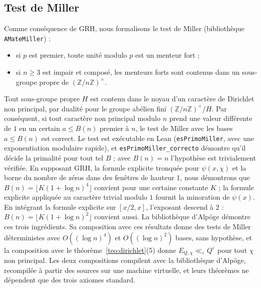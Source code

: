 \documentclass[11pt,a4paper]{amsart}
\theoremstyle{definition}
\theoremstyle{remark}
\begin{document}
\subsection*{Test de Miller}
Comme cons\'equence de GRH, nous formalisons le test de Miller (biblioth\`eque \texttt{AMateMiller}) :
\begin{itemize}
\item si $p$ est premier, toute unit\'e modulo $p$ est un menteur fort ;
\item si $n\ge3$ est impair et compos\'e, les menteurs forts sont contenus dans un sous-groupe propre de $(\mathbb Z/n\mathbb Z)^\times$.
\end{itemize}
Tout sous-groupe propre $H$ est contenu dans le noyau d'un caract\`ere de Dirichlet non principal, par dualit\'e pour le groupe ab\'elien fini $(\mathbb Z/n\mathbb Z)^\times/H$. Par cons\'equent, si tout caract\`ere non principal modulo $n$ prend une valeur diff\'erente de $1$ en un certain $a\le B(n)$ premier \`a $n$, le test de Miller avec les bases $a\le B(n)$ est correct. Le test est ex\'ecutable en Lean (\texttt{esPrimoMiller}, avec une exponentiation modulaire rapide), et \texttt{esPrimoMiller\_correcto} d\'emontre qu'il d\'ecide la primalit\'e pour tout tel $B$ ; avec $B(n)=n$ l'hypoth\`ese est trivialement v\'erifi\'ee. En supposant GRH, la formule explicite tronqu\'ee pour $\psi(x,\chi)$ et la borne du nombre de z\'eros dans des fen\^etres de hauteur $1$, nous d\'emontrons que $B(n)=\lfloor K(1+\log n)^4\rfloor$ convient pour une certaine constante $K$ ; la formule explicite appliqu\'ee au caract\`ere trivial modulo $1$ fournit la minoration de $\psi(x)$. En int\'egrant la formule explicite sur $[x/2,x]$, l'exposant descend \`a $2$ : $B(n)=\lfloor K(1+\log n)^2\rfloor$ convient aussi. La biblioth\`eque d'Alp\"oge d\'emontre ces trois ingr\'edients. Sa composition avec ces r\'esultats donne des tests de Miller d\'eterministes avec $O((\log n)^4)$ et $O((\log n)^2)$ bases, sans hypoth\`ese, et la composition avec le th\'eor\`eme~\ref{teo:dirichlet}(5) donne $E_{Q,\chi}\ll_\varepsilon Q^\varepsilon$ pour tout $\chi$ non principal. Les deux compositions compilent avec la biblioth\`eque d'Alp\"oge, recompil\'ee \`a partir des sources sur une machine virtuelle, et leurs th\'eor\`emes ne d\'ependent que des trois axiomes standard.
\end{document}
